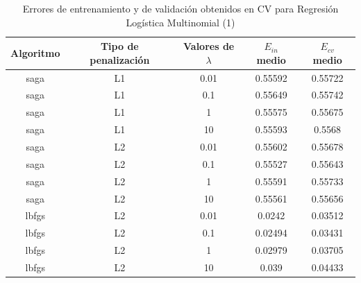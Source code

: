 \documentclass[10pt,a4paper]{article}
\begin{document}
\begin{table}[h]
	\centering
	\begin{tabular}{|c|c|c|c|c|}
		\hline
		\textbf{Algoritmo} & \textbf{Tipo de penalización} & \textbf{Valores de $\lambda$} & \textbf{$E_{in}$ medio} & \textbf{$E_{cv}$ medio} \\ \hline
		saga               & L1                            & 0.01                          & 0.55592                 & 0.55722                 \\ \hline
		saga               & L1                            & 0.1                           & 0.55649                 & 0.55742                 \\ \hline
		saga               & L1                            & 1                             & 0.55575                 & 0.55675                 \\ \hline
		saga               & L1                            & 10                            & 0.55593                 & 0.5568                  \\ \hline
		saga               & L2                            & 0.01                          & 0.55602                 & 0.55678                 \\ \hline
		saga               & L2                            & 0.1                           & 0.55527                 & 0.55643                 \\ \hline
		saga               & L2                            & 1                             & 0.55591                 & 0.55733                 \\ \hline
		saga               & L2                            & 10                            & 0.55561                 & 0.55656                 \\ \hline
		lbfgs              & L2                            & 0.01                          & 0.0242                  & 0.03512                 \\ \hline
		lbfgs              & L2                            & 0.1                           & 0.02494                 & 0.03431                 \\ \hline
		lbfgs              & L2                            & 1                             & 0.02979                 & 0.03705                 \\ \hline
		lbfgs              & L2                            & 10                            & 0.039                   & 0.04433                 \\ \hline
	\end{tabular}
	\caption{Errores de entrenamiento y de validación obtenidos en CV para Regresión Logística Multinomial (1)}
	\label{fig:cla_mlr_cv1}
\end{table}
\end{document}
